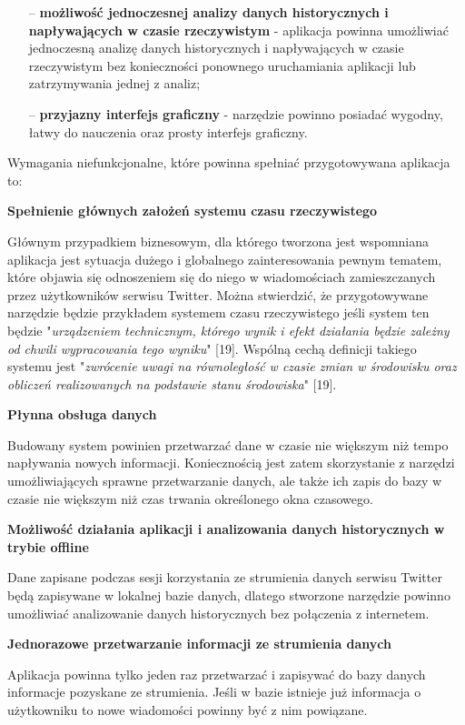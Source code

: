 \begin{itemize}
	\item[--] \textbf{możliwość jednoczesnej analizy danych historycznych i napływających w czasie rzeczywistym} - aplikacja powinna umożliwiać jednoczesną analizę danych historycznych i napływających w czasie rzeczywistym bez konieczności ponownego uruchamiania aplikacji lub zatrzymywania jednej z analiz;
	\item[--] \textbf{przyjazny interfejs graficzny} - narzędzie powinno posiadać wygodny, łatwy do nauczenia oraz prosty interfejs graficzny.
\end{itemize}

Wymagania niefunkcjonalne, które powinna spełniać przygotowywana aplikacja to: 

\textbf{Spełnienie głównych założeń systemu czasu rzeczywistego}

Głównym przypadkiem biznesowym, dla którego tworzona jest wspomniana aplikacja jest sytuacja dużego i globalnego zainteresowania pewnym tematem, które objawia się odnoszeniem się do niego w wiadomościach zamieszczanych przez użytkowników serwisu Twitter. Można stwierdzić, że przygotowywane narzędzie będzie przykładem systemem czasu rzeczywistego jeśli system ten będzie "\textit{urządzeniem technicznym, którego wynik i efekt działania będzie zależny od chwili wypracowania tego wyniku}" [19]. Wspólną cechą definicji takiego systemu jest "\textit{zwrócenie uwagi na równoległość w czasie zmian w środowisku oraz obliczeń realizowanych na podstawie stanu środowiska}" [19].

\textbf{Płynna obsługa danych}

Budowany system powinien przetwarzać dane w czasie nie większym niż tempo napływania nowych informacji. Koniecznością jest zatem skorzystanie z narzędzi umożliwiających sprawne przetwarzanie danych, ale także ich zapis do bazy w czasie nie większym niż czas trwania określonego okna czasowego.

\textbf{Możliwość działania aplikacji i analizowania danych historycznych w trybie offline}

Dane zapisane podczas sesji korzystania ze strumienia danych serwisu Twitter będą zapisywane w lokalnej bazie danych, dlatego stworzone narzędzie powinno umożliwiać analizowanie danych historycznych bez połączenia z internetem.

\textbf{Jednorazowe przetwarzanie informacji ze strumienia danych} 

Aplikacja powinna tylko jeden raz przetwarzać i zapisywać do bazy danych informacje pozyskane ze strumienia. Jeśli w bazie istnieje już informacja o użytkowniku to nowe wiadomości powinny być z nim powiązane. 
 
